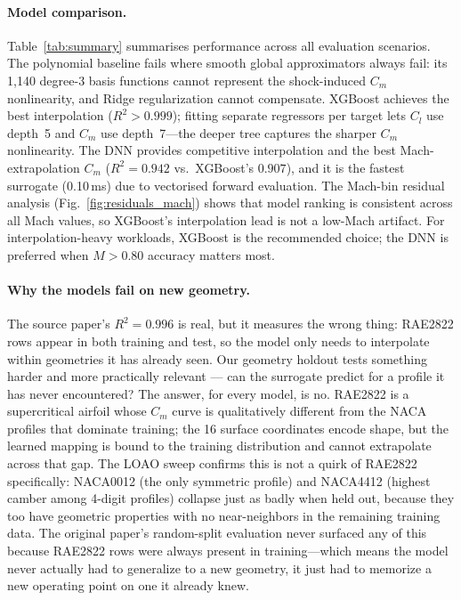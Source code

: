 \documentclass[11pt]{article}
\begin{document}
\paragraph{Model comparison.}
Table~\ref{tab:summary} summarises performance across all evaluation scenarios.
The polynomial baseline fails where smooth global approximators always fail: its
1,140 degree-3 basis functions cannot represent the shock-induced $C_m$
nonlinearity, and Ridge regularization cannot compensate. XGBoost achieves the
best interpolation ($R^2>0.999$); fitting separate regressors per target lets
$C_l$ use depth~5 and $C_m$ use depth~7---the deeper tree captures the
sharper $C_m$ nonlinearity. The DNN provides competitive interpolation and the best Mach-extrapolation
$C_m$ ($R^2=0.942$ vs.\ XGBoost's $0.907$), and it is the fastest surrogate
(0.10\,ms) due to vectorised forward evaluation. The Mach-bin residual
analysis (Fig.~\ref{fig:residuals_mach}) shows that model ranking is
consistent across all Mach values, so XGBoost's interpolation lead is not a
low-Mach artifact. For interpolation-heavy workloads, XGBoost is the
recommended choice; the DNN is preferred when $M>0.80$ accuracy matters most.

\paragraph{Why the models fail on new geometry.}
The source paper's $R^2=0.996$ is real, but it measures the wrong thing:
RAE2822 rows appear in both training and test, so the model only needs to
interpolate within geometries it has already seen. Our geometry holdout
tests something harder and more practically relevant --- can the surrogate
predict for a profile it has never encountered? The answer, for every model,
is no. RAE2822 is a supercritical airfoil whose $C_m$ curve is qualitatively
different from the NACA profiles that dominate training; the 16 surface
coordinates encode shape, but the learned mapping is bound to the training
distribution and cannot extrapolate across that gap. The LOAO sweep
confirms this is not a quirk of RAE2822 specifically: NACA0012 (the only
symmetric profile) and NACA4412 (highest camber among 4-digit profiles)
collapse just as badly when held out, because they too have geometric
properties with no near-neighbors in the remaining training data.
The original paper's random-split evaluation never surfaced any of this
because RAE2822 rows were always present in training---which means the model
never actually had to generalize to a new geometry, it just had to memorize
a new operating point on one it already knew.
\end{document}
